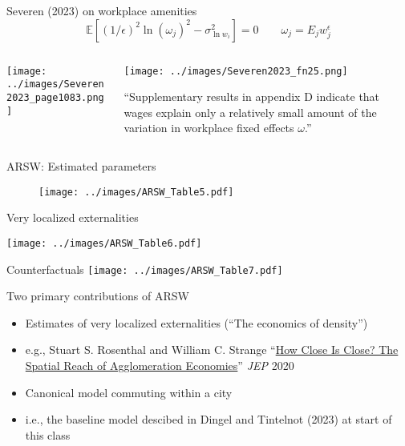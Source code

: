 \documentclass[11pt,notes=hide,aspectratio=169]{beamer}
\begin{document}
\begin{frame}{Severen (2023) on workplace amenities}
\begin{equation*}
\mathbb{E} \left[ \left( 1/\epsilon \right)^{2} \ln \left( \omega_{j} \right)^{2} - \sigma_{\ln w_{i}}^{2} \right] = 0
\qquad
\omega_{j} = E_j w_{j}^{\epsilon}
\end{equation*}
\begin{columns}
\begin{column}{0.49\textwidth}
\texttt{[image: ../images/Severen2023\_page1083.png]}
\end{column}
\begin{column}{0.49\textwidth}
\texttt{[image: ../images/Severen2023\_fn25.png]}\\
{\footnotesize ``Supplementary results in appendix D indicate that wages explain only a relatively small amount of the variation in workplace fixed effects $\omega$.''\par}
\end{column}
\end{columns}
\end{frame}
\begin{frame}{ARSW: Estimated parameters}
\begin{figure}
\centering
\texttt{[image: ../images/ARSW\_Table5.pdf]}
\end{figure}
\end{frame}
\begin{frame}{Very localized externalities}
\begin{center}
\texttt{[image: ../images/ARSW\_Table6.pdf]}
\end{center}
\end{frame}
\begin{frame}{Counterfactuals}
\texttt{[image: ../images/ARSW\_Table7.pdf]}
\end{frame}
\begin{frame}{Two primary contributions of ARSW}
\begin{itemize}
\item Estimates of very localized externalities (``The economics of density'')
\item[] e.g., Stuart S. Rosenthal and William C. Strange ``\href{https://www.aeaweb.org/articles?id=10.1257/jep.34.3.27}{How Close Is Close? The Spatial Reach of Agglomeration Economies}'' \textit{JEP} 2020
\item Canonical model commuting within a city
\item[] i.e., the baseline model descibed in Dingel and Tintelnot (2023) at start of this class
\end{itemize}
\end{frame}
\end{document}
